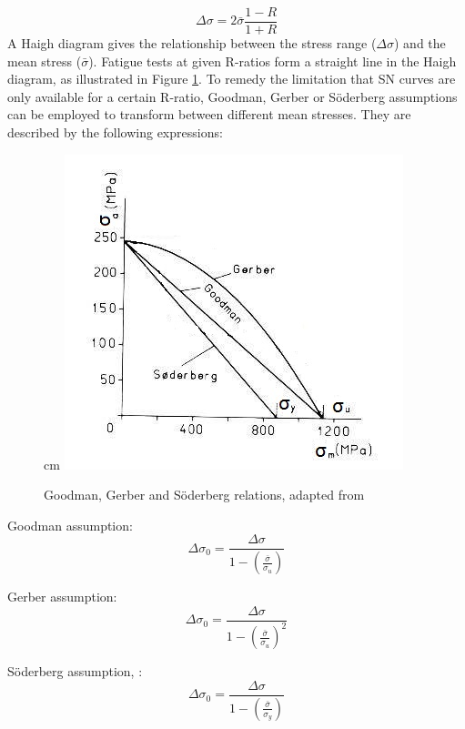 \begin{equation}
    \Delta \sigma = 2 \bar{\sigma} \frac{1-R}{1+R}
\end{equation}
A Haigh diagram gives the relationship between the stress range ($\Delta \sigma$) and the mean stress ($\bar{\sigma}$).  Fatigue tests at given R-ratios form a straight line in the Haigh diagram, as illustrated in Figure \ref{fig:gerber}. To remedy the limitation that  SN curves are only available for a certain R-ratio, Goodman, Gerber or Söderberg assumptions can be employed to transform between different mean stresses. They are described by the following expressions:\newline
\newline
\begin{figure}
     cm 
    \centering
   \includegraphics[scale=0.8]{figures/soder.PNG}
\caption[$\; \:$Goodman, Gerber and Söderberg relations]{Goodman, Gerber and Söderberg relations, adapted from \cite{fatiguehand} }
 \label{fig:gerber}
\end{figure}
\noindent Goodman assumption:
\begin{equation}
    \Delta \sigma_0 = \frac{\Delta \sigma}{1-(\frac{\bar{\sigma}}{\sigma_u})}
\end{equation}

\noindent Gerber assumption:
\begin{equation}
    \Delta \sigma_0 = \frac{\Delta \sigma}{1-(\frac{\bar{\sigma}}{\sigma_u})^2}
\end{equation}

\noindent Söderberg assumption, \cite{fatiguehand}:
\begin{equation}
    \Delta \sigma_0 = \frac{\Delta \sigma}{1-(\frac{\bar{\sigma}}{\sigma_y})}
\end{equation}

